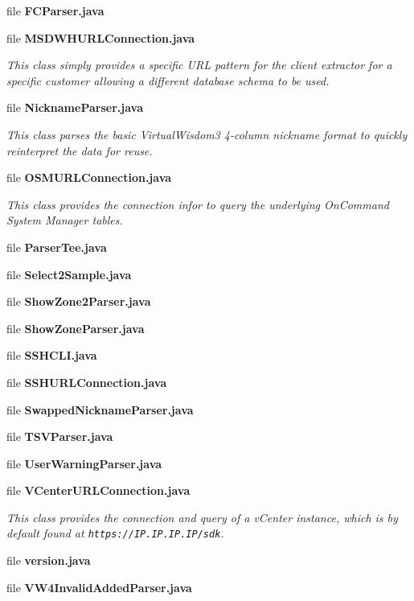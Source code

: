 \begin{DoxyCompactItemize}
file {\bf F\+C\+Parser.\+java}
\item 
file {\bf M\+S\+D\+W\+H\+U\+R\+L\+Connection.\+java}
\begin{DoxyCompactList}\small\item\em This class simply provides a specific U\+R\+L pattern for the client extractor for a specific customer allowing a different database schema to be used. \end{DoxyCompactList}\item 
file {\bf Nickname\+Parser.\+java}
\begin{DoxyCompactList}\small\item\em This class parses the basic Virtual\+Wisdom3 4-\/column nickname format to quickly reinterpret the data for reuse. \end{DoxyCompactList}\item 
file {\bf O\+S\+M\+U\+R\+L\+Connection.\+java}
\begin{DoxyCompactList}\small\item\em This class provides the connection infor to query the underlying On\+Command System Manager tables. \end{DoxyCompactList}\item 
file {\bf Parser\+Tee.\+java}
\item 
file {\bf Select2\+Sample.\+java}
\item 
file {\bf Show\+Zone2\+Parser.\+java}
\item 
file {\bf Show\+Zone\+Parser.\+java}
\item 
file {\bf S\+S\+H\+C\+L\+I.\+java}
\item 
file {\bf S\+S\+H\+U\+R\+L\+Connection.\+java}
\item 
file {\bf Swapped\+Nickname\+Parser.\+java}
\item 
file {\bf T\+S\+V\+Parser.\+java}
\item 
file {\bf User\+Warning\+Parser.\+java}
\item 
file {\bf V\+Center\+U\+R\+L\+Connection.\+java}
\begin{DoxyCompactList}\small\item\em This class provides the connection and query of a v\+Center instance, which is by default found at {\tt https\+://\+I\+P.\+I\+P.\+I\+P.\+I\+P/sdk}. \end{DoxyCompactList}\item 
file {\bf version.\+java}
\item 
file {\bf V\+W4\+Invalid\+Added\+Parser.\+java}
\item 

\end{DoxyCompactItemize}
